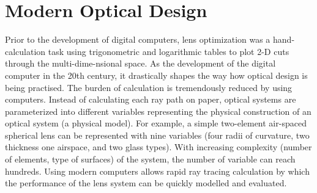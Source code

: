 \section{Modern Optical Design}
\vspace{1em}
Prior to the development of digital computers, lens optimization was a hand-calculation task using trigonometric and logarithmic tables to plot 2-D cuts through the multi-dime-nsional space. As the development of the digital computer in the 20th century, it drastically shapes the way how optical design is being practised. The burden of calculation is tremendously reduced by using computers. Instead of calculating each ray path on paper,  optical systems are parameterized into different variables representing the physical construction of an optical system (a physical model). For example, a simple two-element air-spaced spherical lens can be represented with nine variables (four radii of curvature, two thickness one airspace, and two glass types). With increasing complexity (number of elements, type of surfaces) of the system, the number of variable can reach hundreds. Using modern computers allows rapid ray tracing calculation by which the performance of the lens system can be quickly modelled and evaluated. 

